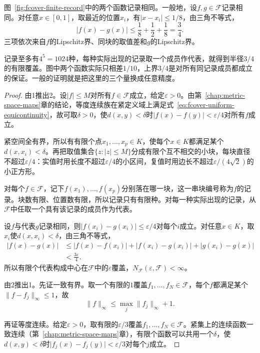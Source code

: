 图~\ref{fig:fcover-finite-record}中的两个函数记录相同。一般地，设$f,g\in\mathcal F$记录相同。对任意$x\in[0,1]$，取最近的位置$x_i$，有$\lvert x-x_i\rvert\leq1/8$，由三角不等式，
\[
 \lvert f(x)-g(x)\rvert\leq\frac18+\frac12+\frac18=\frac34 .
\]
三项依次来自$f$的Lipschitz界、同块的取值差和$g$的Lipschitz界。

记录至多有$4^5=1024$种，每种实际出现的记录取一个成员作代表，就得到半径$3/4$的有限覆盖。图中两个函数实际只相差$1/10$，上界$3/4$是对所有同记录成员都成立的保证。一般的证明就是把这里的三个量换成任意精度。

\begin{proof}
由1推出2。设$\lvert f\rvert\leq M$对所有$f\in\mathcal F$成立，给定$\varepsilon>0$。由第~\ref{chap:metric-space-maps}章的结论，等度连续族在紧定义域上满足式~\eqref{eq:fcover-uniform-equicontinuity}，故可取$\delta>0$，使$d(x,y)<\delta$时$\lvert f(x)-f(y)\rvert<\varepsilon/4$对所有$f$成立。

紧空间全有界，所以有有限个点$x_1,\ldots,x_p\in K$，使每个$x\in K$都满足某个$d(x,x_i)<\delta$。再把取值集合$\{z:\lvert z\rvert\leq M\}$分成有限个互不相交的小块，每块直径不超过$\varepsilon/4$：实值时用长度不超过$\varepsilon/4$的小区间，复值时用边长不超过$\varepsilon/(4\sqrt2)$的小正方形。

对每个$f\in\mathcal F$，记下$f(x_1),\ldots,f(x_p)$分别落在哪一块，这一串块编号称为$f$的记录。块数有限、位置数有限，所以记录只有有限种。对每一种实际出现的记录，从$\mathcal F$中任取一个具有该记录的成员作为代表。

设$f$与代表$g$记录相同，则$\lvert f(x_i)-g(x_i)\rvert\leq\varepsilon/4$对每个$i$成立。对任意$x\in K$，取$x_i$使$d(x,x_i)<\delta$，由三角不等式，
\[
 \begin{aligned}
 \lvert f(x)-g(x)\rvert
 &\leq\lvert f(x)-f(x_i)\rvert+\lvert f(x_i)-g(x_i)\rvert+\lvert g(x_i)-g(x)\rvert\\
 &<\frac{3\varepsilon}4 .
 \end{aligned}
\]
所以有限个代表构成中心在$\mathcal F$中的$\varepsilon$覆盖，$N_{\mathcal F}(\varepsilon,\mathcal F)<\infty$。

由2推出1。先证一致有界。取一个有限的$1$覆盖$f_1,\ldots,f_N\in\mathcal F$，每个$f$都满足某个$\lVert f-f_j\rVert_\infty\leq1$，故
\[
 \lVert f\rVert_\infty\leq\max_j\lVert f_j\rVert_\infty+1 .
\]

再证等度连续。给定$\varepsilon>0$，取有限的$\varepsilon/3$覆盖$f_1,\ldots,f_N\in\mathcal F$。紧集上的连续函数一致连续（第~\ref{chap:metric-space-maps}章），有限个函数可以共用一个$\delta$，使$d(x,y)<\delta$时$\lvert f_j(x)-f_j(y)\rvert<\varepsilon/3$对每个$j$成立。


\end{proof}
